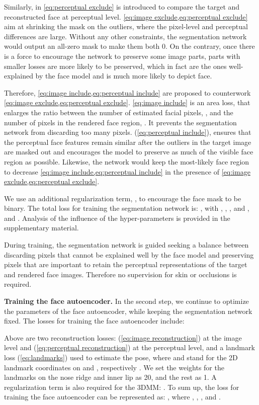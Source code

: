 \documentclass[10pt,twocolumn,letterpaper]{article}
\begin{document}
Similarly,  in \cref{eq:perceptual exclude} is introduced to compare the target and reconstructed face at perceptual level.
\cref{eq:image exclude,eq:perceptual exclude} aim at shrinking the mask on the outliers, where the pixel-level and perceptual differences are large. Without any other constraints, the segmentation network would output an all-zero mask to make them both 0. On the contrary, once there is a force to encourage the network to preserve some image parts, parts with smaller losses are more likely to be preserved, which in fact are the ones well-explained by the face model and is much more likely to depict face.

Therefore, \cref{eq:image include,eq:perceptual include} are proposed to counterwork \cref{eq:image exclude,eq:perceptual exclude}. \cref{eq:image include} is an area loss,  that enlarges the ratio between the number of estimated facial pixels, , and the number of pixels in the rendered face region, . It prevents the segmentation network from discarding too many pixels.  (\cref{eq:perceptual include}), ensures that the perceptual face features remain similar after the outliers in the target image are masked out and encourages the model to preserve as much of the visible face region as possible. Likewise, the network would keep the most-likely face region to decrease \cref{eq:image include,eq:perceptual include} in the presence of \cref{eq:image exclude,eq:perceptual exclude}.

We use an additional regularization term,  , to encourage the face mask  to be binary.
The total loss for training the segmentation network is:
{ }, with , , , and , and . Analysis of the influence of the hyper-parameters is provided in the supplementary material.

During training, the segmentation network is guided seeking a balance between discarding pixels that cannot be explained well by the face model and preserving pixels that are important to retain the perceptual representations of the target and rendered face images. Therefore no supervision for skin or occlusions is required.

\textbf{Training the face autoencoder.} In the second step, we continue to optimize the parameters of the face autoencoder, while keeping the segmentation network fixed. 
The losses for training the face autoencoder include:
    \begin{small}
   
\end{small}
Above are two reconstruction losses:  (\cref{eq:image reconstruction}) at the image level and  (\cref{eq:perceptual reconstruction}) at the perceptual level, and a landmark loss (\cref{eq:landmarks}) used to estimate the pose, where  and  stand for the 2D landmark coordinates on  and , respectively \cite{deng2019accurate}. We set the weights for the landmarks on the nose ridge and inner lip as 20, and the rest as 1. A regularization term is also required for the 3DMM: . To sum up, the loss for training the face autoencoder can be represented as: 
, where , , , and .
\end{document}
